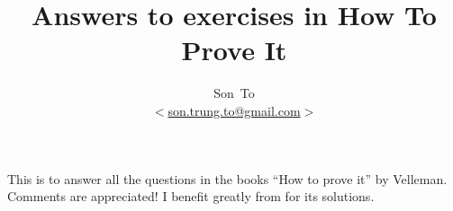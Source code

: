 \documentclass[a4paper,11pt]{article}
\author{Son~To\\
$<$\href{mailto:son.trung.to@gmail.com}{son.trung.to@gmail.com}$>$}
\affil{StaffPoint Oy}
\title{Answers to exercises in How To Prove It}
\theoremstyle{plain} \newtheorem{id}{Lemma}[section]
\theoremstyle{definition} \newtheorem{ex}{Exercise}[subsection]
\theoremstyle{remark}     \newtheorem{ab}{Conjecture}[section]
\begin{document}
  \maketitle
  This is to answer all the questions in the books ``How to prove it'' by Velleman.
  Comments are appreciated! I benefit greatly from \cite{inchmeal} for its solutions.

  \clearpage
  \tableofcontents
  \clearpage

  
  
  

  
  
\end{document}
